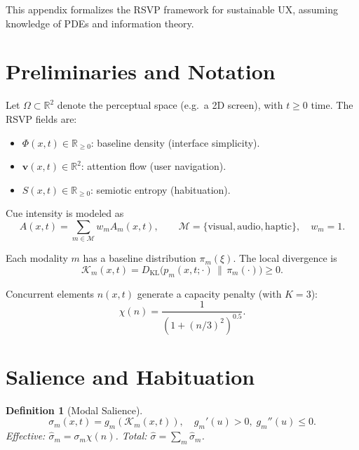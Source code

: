 \documentclass[openany]{book}
\newtheorem{definition}{Definition}[chapter]
\begin{document}
This appendix formalizes the RSVP framework for sustainable UX, assuming knowledge of PDEs and information theory.

\section{Preliminaries and Notation}
\label{sec:rsvp-prelim}
Let $\Omega \subset \mathbb{R}^2$ denote the perceptual space (e.g.\ a 2D screen), with $t \geq 0$ time.  
The RSVP fields are:
\begin{itemize}
  \item $\Phi(x,t) \in \mathbb{R}_{\geq 0}$: baseline density (interface simplicity).
  \item $\mathbf{v}(x,t) \in \mathbb{R}^2$: attention flow (user navigation).
  \item $S(x,t) \in \mathbb{R}_{\geq 0}$: semiotic entropy (habituation).
\end{itemize}

Cue intensity is modeled as
\begin{equation}
A(x,t) = \sum_{m \in \mathcal{M}} w_m A_m(x,t), 
\qquad \mathcal{M} = \{\text{visual}, \text{audio}, \text{haptic}\}, 
\quad w_m = 1.
\end{equation}

Each modality $m$ has a baseline distribution $\pi_m(\xi)$.  
The local divergence is
\begin{equation}
\label{eq:KL}
\mathcal{K}_m(x,t) = D_{\mathrm{KL}}\!\big(p_m(x,t;\cdot) \,\big\|\, \pi_m(\cdot)\big) \geq 0.
\end{equation}

Concurrent elements $n(x,t)$ generate a capacity penalty (with $K=3$):
\begin{equation}
\label{eq:capacity}
\chi(n) = \frac{1}{\left(1+(n/3)^2\right)^{0.5}}.
\end{equation}

\section{Salience and Habituation}
\label{sec:rsvp-salience}

\begin{definition}[Modal Salience]
\begin{equation}
\sigma_m(x,t) = g_m(\mathcal{K}_m(x,t)), \quad g_m'(u)>0, \; g_m''(u)\leq 0.
\end{equation}
Effective: $\widehat{\sigma}_m = \sigma_m \chi(n)$.  
Total: $\widehat{\sigma} = \sum_m \widehat{\sigma}_m$.
\end{definition}
\end{document}
